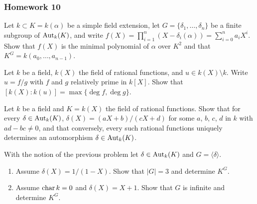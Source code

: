 \subsubsection{Homework 10}
\setcounter{exercise}{0}
\setcounter{equation}{0}

\begin{problem}
  Let \(k\subset K=k(\alpha)\) be a simple field extension, let
  \(G=\{\delta_1,\dotsc,\delta_n\}\) be a finite subgroup of \(\operatorname{Aut}_k(K)\),
  and write
  \(f(X)=\prod_{i=1}^n(X-\delta_i(\alpha))=\sum_{i=0}^na_iX^i\). Show that
  \(f(X)\) is the minimal polynomial of \(\alpha\) over \(K^2\) and that
  \(K^G=k(a_0,\dotsc,a_{n-1})\).
\end{problem}
\begin{solution}
\end{solution}

\begin{problem}
  Let \(k\) be a field, \(k(X)\) the field of rational functions, and
  \(u\in k(X)\setminus k\). Write \(u= f/g\) with \(f\) and \(g\)
  relatively prime in \(k[X]\). Show that
  \([k(X):k(u)]=\max\{{\deg f},{\deg g}\}\).
\end{problem}
\begin{solution}
\end{solution}

\begin{problem}
  Let \(k\) be a field and \(K= k(X)\) the field of rational
  functions. Show that for every \(\delta\in\operatorname{Aut}_k(K)\),
  \(\delta(X)= (aX+b)/(cX+d)\) for some \(a\), \(b\), \(c\), \(d\) in \(k\)
  with \(ad-bc\neq 0\), and that conversely, every such rational functions
  uniquely determines an automorphism \(\delta\in\operatorname{Aut}_k(K)\).
\end{problem}
\begin{solution}
\end{solution}

\begin{problem}
  With the notion of the previous problem let \(\delta\in\operatorname{Aut}_k(K)\) and
  \(G=\langle \delta \rangle\).
  \begin{enumerate}[label=(\alph*),noitemsep]
  \item Assume \(\delta(X)=1/(1-X)\). Show that \(|G|=3\) and determine
    \(K^G\).
  \item Assume \(\operatorname{char} k=0\) and \(\delta(X)=X+1\). Show that \(G\) is
    infinite and determine \(K^G\).
  \end{enumerate}
\end{problem}
\begin{solution}
\end{solution}

